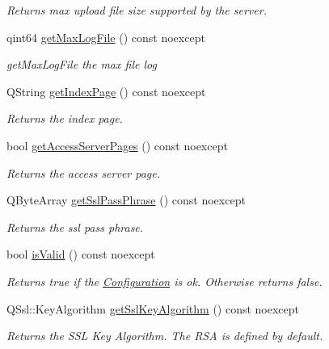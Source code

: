 \begin{DoxyCompactItemize}
\begin{DoxyCompactList}\small\item\em Returns max upload file size supported by the server. \end{DoxyCompactList}\item 
qint64 \hyperlink{class_configuration_af0ff5f0aca0bd13e5676847db77bac58}{get\+Max\+Log\+File} () const noexcept
\begin{DoxyCompactList}\small\item\em get\+Max\+Log\+File the max file log \end{DoxyCompactList}\item 
Q\+String \hyperlink{class_configuration_ab67d7ba6abdfc27f5a66042377b01cd4}{get\+Index\+Page} () const noexcept
\begin{DoxyCompactList}\small\item\em Returns the index page. \end{DoxyCompactList}\item 
bool \hyperlink{class_configuration_a28db1b4cea9169d74939107f45e18123}{get\+Access\+Server\+Pages} () const noexcept
\begin{DoxyCompactList}\small\item\em Returns the access server page. \end{DoxyCompactList}\item 
Q\+Byte\+Array \hyperlink{class_configuration_ae5e1bc207332b2f089f2168ada606c48}{get\+Ssl\+Pass\+Phrase} () const noexcept
\begin{DoxyCompactList}\small\item\em Returns the ssl pass phrase. \end{DoxyCompactList}\item 
bool \hyperlink{class_configuration_aad998fe40caeeb4c412f00f0874c67c9}{is\+Valid} () const noexcept
\begin{DoxyCompactList}\small\item\em Returns true if the \hyperlink{class_configuration}{Configuration} is ok. Otherwise returns false. \end{DoxyCompactList}\item 
Q\+Ssl\+::\+Key\+Algorithm \hyperlink{class_configuration_a490e50bab0cdb1ccb531ee2472e97ca6}{get\+Ssl\+Key\+Algorithm} () const noexcept
\begin{DoxyCompactList}\small\item\em Returns the S\+SL Key Algorithm. The R\+SA is defined by default. \end{DoxyCompactList}\item 

\end{DoxyCompactItemize}
